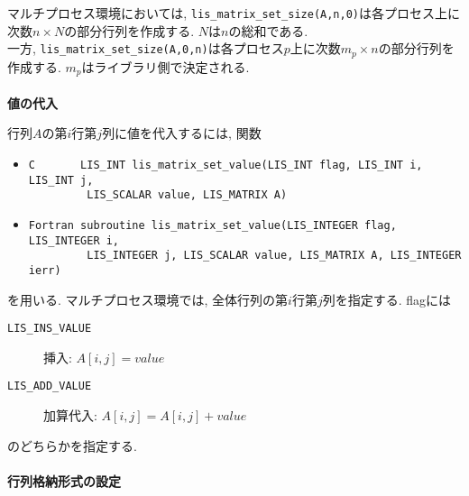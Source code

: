 \documentclass[a4paper]{jarticle}
\begin{document}
{{マルチプロセス環境においては, \verb|lis_matrix_set_size(A,n,0)|は各プロセス上に次数$n \times N$の部分行列を作成する. $N$は$n$の総和である. \\
一方, \verb|lis_matrix_set_size(A,0,n)|は各プロセス$p$上に次数$m_p \times n$の部分行列を作成する. $m_p$はライブラリ側で決定される. 
\\ \\
\noindent
{\bf 値の代入}

行列$A$の第$i$行第$j$列に値を代入するには, 関数
\begin{itemize}
\item \verb|C       LIS_INT lis_matrix_set_value(LIS_INT flag, LIS_INT i, LIS_INT j,|\\
      \verb|         LIS_SCALAR value, LIS_MATRIX A)|
\item \verb|Fortran subroutine lis_matrix_set_value(LIS_INTEGER flag, LIS_INTEGER i,|\\
      \verb|         LIS_INTEGER j, LIS_SCALAR value, LIS_MATRIX A, LIS_INTEGER ierr)|
\end{itemize}
を用いる. マルチプロセス環境では, 全体行列の第$i$行第$j$列を指定する. 
flagには
\begin{description}
\item[\tt LIS\_INS\_VALUE] 挿入: $A[i,j] = value$
\item[\tt LIS\_ADD\_VALUE] 加算代入: $A[i,j] = A[i,j] + value$
\end{description}
のどちらかを指定する. 
\\ \\
\noindent
{\bf 行列格納形式の設定}

}}
\end{document}
